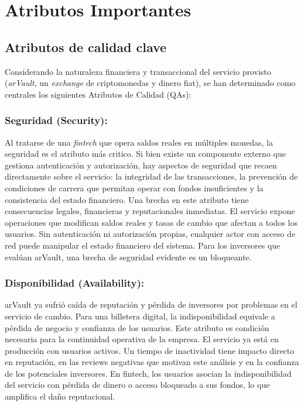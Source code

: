 \section{Atributos Importantes}
\label{sec:atributos-importantes}

\subsection{Atributos de calidad clave}
\label{subsec:qas-clave}

Considerando la naturaleza financiera y transaccional del servicio provisto (\textit{arVault}, un \textit{exchange} de criptomonedas y dinero fiat), se han determinado como centrales los siguientes Atributos de Calidad (QAs):

\subsubsection{Seguridad (Security):} Al tratarse de una \textit{fintech} que opera saldos reales en múltiples monedas, la seguridad es el atributo más critico. Si bien existe un componente externo que gestiona autenticación y autorización, hay aspectos de seguridad que recaen directamente sobre el servicio: la integridad de las transacciones, la prevención de condiciones de carrera que permitan operar con fondos insuficientes y la consistencia del estado financiero. Una brecha en este atributo tiene consecuencias legales, financieras y reputacionales inmediatas. El servicio expone operaciones que modifican saldos reales y tasas de cambio que afectan a todos los usuarios. Sin autenticación ni autorización propias, cualquier actor con acceso de red puede manipular el estado financiero del sistema. Para los inversores que evalúan arVault, una brecha de seguridad evidente es un bloqueante.
\subsubsection{Disponibilidad (Availability):} arVault ya sufrió caída de reputación y pérdida de inversores por problemas en el servicio de cambio. Para una billetera digital, la indisponibilidad equivale a pérdida de negocio y confianza de los usuarios. Este atributo es condición necesaria para la continuidad operativa de la empresa. El servicio ya está en producción con usuarios activos. Un tiempo de inactividad tiene impacto directo en reputación, en las reviews negativas que  motivan este análisis y en la confianza de los potenciales inversores. En fintech, los usuarios asocian la indisponibilidad del servicio con pérdida de dinero o acceso bloqueado a sus fondos, lo que amplifica el daño reputacional.
